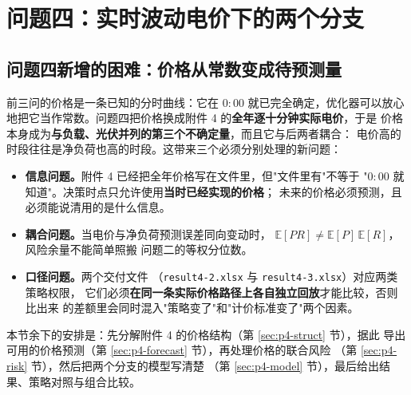 
\section{问题四：实时波动电价下的两个分支}

\subsection{问题四新增的困难：价格从常数变成待预测量}

前三问的价格是一条已知的分时曲线：它在 $0{:}00$ 就已完全确定，优化器可以放心
地把它当作常数。问题四把价格换成附件 4 的\textbf{全年逐十分钟实际电价}，于是
价格本身成为\textbf{与负载、光伏并列的第三个不确定量}，而且它与后两者耦合：
电价高的时段往往是净负荷也高的时段。这带来三个必须分别处理的新问题：

\begin{itemize}
  \item \textbf{信息问题。}附件 4 已经把全年价格写在文件里，但"文件里有"不等于
        "$0{:}00$ 就知道"。决策时点只允许使用\textbf{当时已经实现的价格}；
        未来的价格必须预测，且必须能说清用的是什么信息。
  \item \textbf{耦合问题。}当电价与净负荷预测误差同向变动时，
        $\mathbb{E}[PR]\neq\mathbb{E}[P]\,\mathbb{E}[R]$，风险余量不能简单照搬
        问题二的等权分位数。
  \item \textbf{口径问题。}两个交付文件
        （\texttt{result4-2.xlsx} 与 \texttt{result4-3.xlsx}）对应两类策略权限，
        它们必须\textbf{在同一条实际价格路径上各自独立回放}才能比较，否则比出来
        的差额里会同时混入"策略变了"和"计价标准变了"两个因素。
\end{itemize}

本节余下的安排是：先分解附件 4 的价格结构（第 \ref{sec:p4-struct} 节），据此
导出可用的价格预测（第 \ref{sec:p4-forecast} 节），再处理价格的联合风险
（第 \ref{sec:p4-risk} 节），然后把两个分支的模型写清楚
（第 \ref{sec:p4-model} 节），最后给出结果、策略对照与组合比较。

